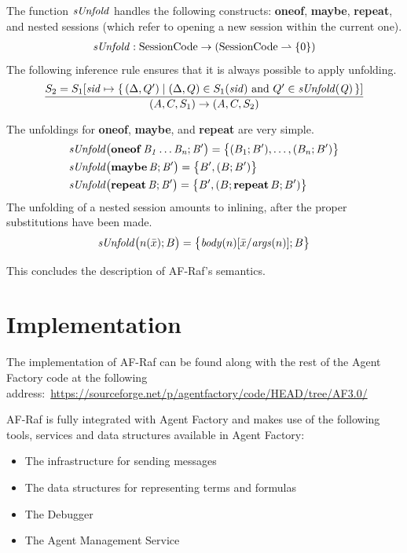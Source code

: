 \documentclass[a4paper,12pt,oneside,fleqn]{book} %
\newcommand{\pmap}{\rightharpoonup}
\begin{document}
{The function $\it sUnfold$ handles the following constructs: {\bf oneof},
{\bf maybe}, {\bf repeat}, and nested sessions (which refer to opening a
new session within the current one).
\begin{align}
{\it sUnfold} : {\rm SessionCode}\to({\rm SessionCode}\pmap\{0\})
\end{align}
The following inference rule ensures that it is always possible to apply
unfolding.
\begin{align}
\frac
  {S_2=S_1[{\it sid}\mapsto\{\,(\Delta,Q')
    \mid\text{$(\Delta,Q)\in S_1({\it sid})$ and $Q'\in{\it sUnfold(Q)}$}\,\}]}
  {(A,C,S_1)\to(A,C,S_2)}
\end{align}

The unfoldings for {\bf oneof}, {\bf maybe}, and {\bf repeat} are very
simple.
\begin{align}
&{\it sUnfold\bigl({\bf oneof}\,B_1\ldots B_n; B'\bigr)}
  = \bigl\{ (B_1;B'),\ldots,(B_n;B')\bigr\}
\\
&{\it sUnfold\bigl({\bf maybe}\,B;B'\bigr)}
  = \bigl\{ B', (B;B')\bigr\} \\
&{\it sUnfold\bigl({\bf repeat}\,B;B'\bigr)}
  = \bigl\{ B', (B;{\bf repeat}\,B;B')\bigr\}
\end{align}
The unfolding of a nested session amounts to inlining, after the proper
substitutions have been made.
\begin{align}
{\it sUnfold}\bigl(n(\bar{x}); B\bigr)
  = \bigl\{ {\it body}(n)[\bar{x}/{\it args}(n)]; B \bigr\}
\end{align}

This concludes the description of AF-Raf's semantics.

\chapter{Implementation}\label{ch:implem} %

The implementation of AF-Raf can be found along with the rest of
the Agent Factory code at the following
address:~\url{https://sourceforge.net/p/agentfactory/code/HEAD/tree/AF3.0/}

AF-Raf is fully integrated with Agent Factory and makes use of the
following tools, services and data structures available in Agent Factory:

\begin{itemize}
    \item The infrastructure for sending messages
    \item The data structures for representing terms and formulas
    \item The Debugger
    \item The Agent Management Service
\end{itemize}

}
\end{document}
